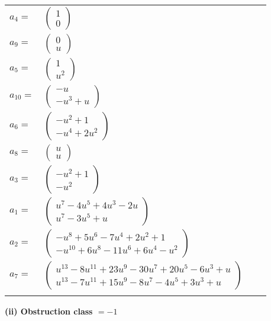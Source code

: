 \documentclass[1p]{elsarticle_modified}
\theoremstyle{definition}
\begin{document}
\begin{tabular}{m{7pt} m{180pt} m{7pt} m{180pt} }
\flushright $a_{4}=$&$\begin{pmatrix}1\\0\end{pmatrix}$ \\
\flushright $a_{9}=$&$\begin{pmatrix}0\\u\end{pmatrix}$ \\
\flushright $a_{5}=$&$\begin{pmatrix}1\\u^2\end{pmatrix}$ \\
\flushright $a_{10}=$&$\begin{pmatrix}- u\\- u^3+u\end{pmatrix}$ \\
\flushright $a_{6}=$&$\begin{pmatrix}- u^2+1\\- u^4+2 u^2\end{pmatrix}$ \\
\flushright $a_{8}=$&$\begin{pmatrix}u\\u\end{pmatrix}$ \\
\flushright $a_{3}=$&$\begin{pmatrix}- u^2+1\\- u^2\end{pmatrix}$ \\
\flushright $a_{1}=$&$\begin{pmatrix}u^7-4 u^5+4 u^3-2 u\\u^7-3 u^5+u\end{pmatrix}$ \\
\flushright $a_{2}=$&$\begin{pmatrix}- u^8+5 u^6-7 u^4+2 u^2+1\\- u^{10}+6 u^8-11 u^6+6 u^4- u^2\end{pmatrix}$ \\
\flushright $a_{7}=$&$\begin{pmatrix}u^{13}-8 u^{11}+23 u^9-30 u^7+20 u^5-6 u^3+u\\u^{13}-7 u^{11}+15 u^9-8 u^7-4 u^5+3 u^3+u\end{pmatrix}$\\&\end{tabular}
\flushleft \textbf{(ii) Obstruction class $= -1$}\\~\\
\end{document}
